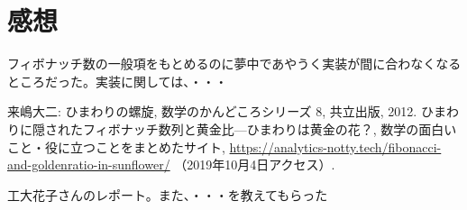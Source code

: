 \documentclass[uplatex,12pt]{jsarticle}
\begin{document}
\section{感想}
フィボナッチ数の一般項をもとめるのに夢中であやうく実装が間に合わなくなるところだった。実装に関しては、・・・


\begin{thebibliography}{99}
 来嶋大二: ひまわりの螺旋, 数学のかんどころシリーズ 8, 共立出版, 2012.
 ひまわりに隠されたフィボナッチ数列と黄金比---ひまわりは黄金の花？, 数学の面白いこと・役に立つことをまとめたサイト, \url{https://analytics-notty.tech/fibonacci-and-goldenratio-in-sunflower/} （2019年10月4日アクセス）.

 工大花子さんのレポート。また、・・・を教えてもらった 

\end{thebibliography}
\end{document}
